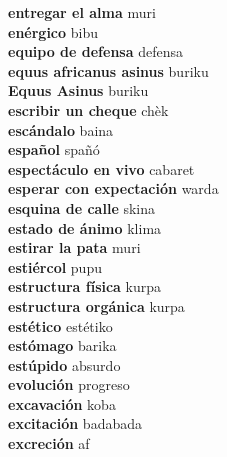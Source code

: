 \textbf{ entregar el alma  } muri \\
\textbf{ enérgico  } bibu \\
\textbf{ equipo de defensa  } defensa \\
\textbf{ equus africanus asinus  } buriku \\
\textbf{ Equus Asinus  } buriku \\
\textbf{ escribir un cheque  } chèk \\
\textbf{ escándalo  } baina \\
\textbf{ español  } spañó \\
\textbf{ espectáculo en vivo  } cabaret \\
\textbf{ esperar con expectación  } warda \\
\textbf{ esquina de calle  } skina \\
\textbf{ estado de ánimo  } klima \\
\textbf{ estirar la pata  } muri \\
\textbf{ estiércol  } pupu \\
\textbf{ estructura física  } kurpa \\
\textbf{ estructura orgánica  } kurpa \\
\textbf{ estético  } estétiko \\
\textbf{ estómago  } barika \\
\textbf{ estúpido  } absurdo \\
\textbf{ evolución  } progreso \\
\textbf{ excavación  } koba \\
\textbf{ excitación  } badabada \\
\textbf{ excreción  } af \\
